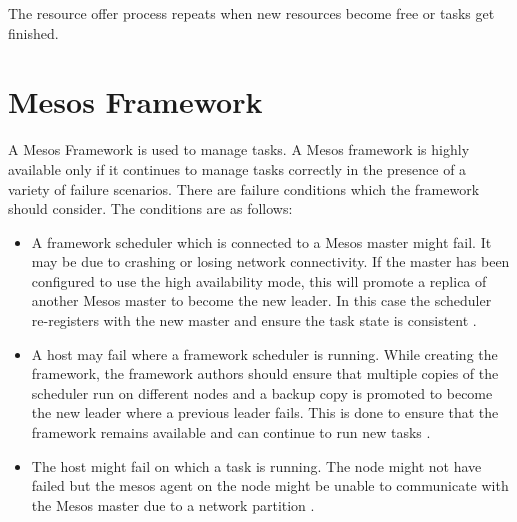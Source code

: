 \documentclass[9pt,twocolumn,twoside]{../../styles/osajnl}
\begin{document}
The resource offer process repeats when new resources become free or tasks
get finished.

\section{Mesos Framework}
A Mesos Framework is used to manage tasks. A Mesos framework is highly
available only if it continues to manage tasks correctly in the
presence of a variety of failure scenarios. There are failure
conditions which the framework should consider. The conditions are as
follows:

\begin{itemize}
\item A framework scheduler which is connected to a Mesos master might
  fail. It may be due to crashing or losing network connectivity. If
  the master has been configured to use the high availability mode,
  this will promote a replica of another Mesos master to become the
  new leader. In this case the scheduler re-registers with the new
  master and ensure the task state is consistent
  \cite{www-mesos-frmwrk}.
\item A host may fail where a framework scheduler is running. While
  creating the framework, the framework authors should ensure that
  multiple copies of the scheduler run on different nodes and a backup
  copy is promoted to become the new leader where a previous leader
  fails. This is done to ensure that the framework remains available
  and can continue to run new tasks \cite{www-mesos-frmwrk}.
\item The host might fail on which a task is running. The node might
  not have failed but the mesos agent on the node might be unable to
  communicate with the Mesos master due to a network partition
  \cite{www-mesos-frmwrk}.
\end{itemize}
\end{document}
